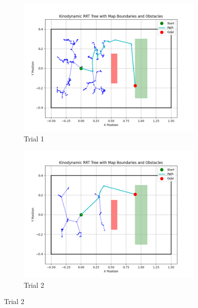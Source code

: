 \documentclass[12pt]{article}
\begin{document}
\begin{figure}[h!]
    \centering
    \begin{subfigure}{0.45\textwidth}
        \centering
        \includegraphics[width=\textwidth]{./images/tree1.png}
        \caption{Trial 1}
        \label{fig:tree_1}
    \end{subfigure}
    \hfill
    \begin{subfigure}{0.45\textwidth}
        \centering
        \includegraphics[width=\textwidth]{./images/tree2.png}
        \caption{Trial 2}
        \label{fig:tree_2}
    \end{subfigure}
    
    \vspace{0.5cm} %


\end{figure}
\end{document}
